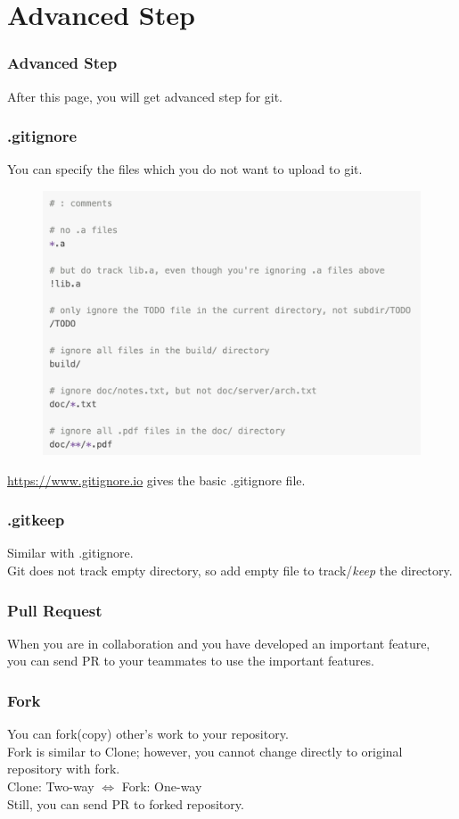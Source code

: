\documentclass[aspectratio=169]{beamer}
\begin{document}
	\section{Advanced Step}
	\begin{frame}
		\frametitle{Advanced Step}
		After this page, you will get advanced step for git. 
	\end{frame}

	\begin{frame}
		\frametitle{.gitignore}
		You can specify the files which you do not want to upload to git.
		\begin{figure}
			\centering
			\includegraphics[width=0.4 \linewidth]{figures/gitignore.png}
		\end{figure}
		\url{https://www.gitignore.io} gives the basic .gitignore file.
	\end{frame}

	\begin{frame}
		\frametitle{.gitkeep}
		
		Similar with .gitignore.\\
		Git does not track empty directory, so add empty file to track/\textit{keep} the directory. 
	\end{frame}

	\begin{frame}
		\frametitle{Pull Request}
		
		When you are in collaboration and you have developed an important feature, \\
		you can send PR to your teammates to use the important features. 
	\end{frame}

	\begin{frame}
		\frametitle{Fork}
		
		You can fork(copy) other's work to your repository. \\
		Fork is similar to Clone; however, you cannot change directly to original repository with fork. \\
		Clone: Two-way $\Leftrightarrow$ Fork: One-way \\
		
		Still, you can send PR to forked repository. 
	\end{frame}
\end{document}
